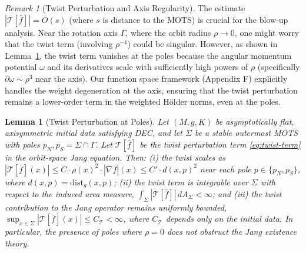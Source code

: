 \documentclass[12pt]{article}
\theoremstyle{plain}
\newtheorem{lemma}[theorem]{Lemma}
\theoremstyle{definition}
\theoremstyle{remark}
\newtheorem{remark}[theorem]{Remark}
\begin{document}
\begin{remark}[Twist Perturbation and Axis Regularity]\label{rem:twist-regularity-check}
The estimate $|\mathcal{T}[\bar{f}]| = O(s)$ (where $s$ is distance to the MOTS) is crucial for the blow-up analysis. Near the rotation axis $\Gamma$, where the orbit radius $\rho \to 0$, one might worry that the twist term (involving $\rho^{-4}$) could be singular. However, as shown in Lemma~\ref{lem:twist-bound-poles}, the twist term vanishes at the poles because the angular momentum potential $\omega$ and its derivatives scale with sufficiently high powers of $\rho$ (specifically $\partial \omega \sim \rho^3$ near the axis). Our function space framework (Appendix F) explicitly handles the weight degeneration at the axis, ensuring that the twist perturbation remains a lower-order term in the weighted H\"older norms, even at the poles.
\end{remark}

\begin{lemma}[Twist Perturbation at Poles]\label{lem:twist-bound-poles}
Let $(M, g, K)$ be asymptotically flat, axisymmetric initial data satisfying DEC, and let $\Sigma$ be a stable outermost MOTS with poles $p_N, p_S = \Sigma \cap \Gamma$. Let $\mathcal{T}[\bar{f}]$ be the twist perturbation term \eqref{eq:twist-term} in the orbit-space Jang equation. Then: (i) the twist scales as $|\mathcal{T}[\bar{f}](x)| \leq C \cdot \rho(x)^2 \cdot |\bar{\nabla}\bar{f}|(x) \leq C' \cdot d(x,p)^2$ near each pole $p \in \{p_N, p_S\}$, where $d(x,p) = \mathrm{dist}_g(x,p)$; (ii) the twist term is integrable over $\Sigma$ with respect to the induced area measure, $\int_\Sigma |\mathcal{T}[\bar{f}]| \, dA_\Sigma < \infty$; and (iii) the twist contribution to the Jang operator remains uniformly bounded, $\sup_{x \in \Sigma} |\mathcal{T}[\bar{f}](x)| \leq C_\mathcal{T} < \infty$, where $C_\mathcal{T}$ depends only on the initial data. In particular, the presence of poles where $\rho = 0$ does not obstruct the Jang existence theory.
\end{lemma}
\end{document}

